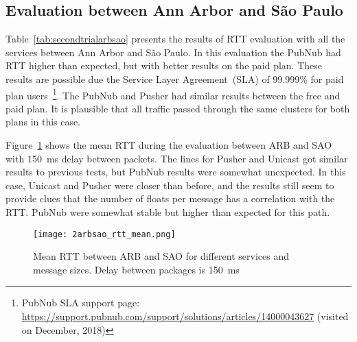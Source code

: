 \subsection*{Evaluation between Ann Arbor and São Paulo} 

Table~\ref{tab:secondtrialarbsao} presents the results of RTT evaluation with all the services between Ann Arbor and São Paulo.
In this evaluation the PubNub had RTT higher than expected, but with better results on the paid plan.
These results are possible due the Service Layer Agreement~(SLA) of 99.999\% for paid plan users~\footnote{PubNub SLA support page: \url{https://support.pubnub.com/support/solutions/articles/14000043627} (visited on December, 2018)}. 
The PubNub and Pusher had similar results between the free and paid plan.
It is plausible that all traffic passed through the same clusters for both plans in this case.

Figure~\ref{fig:second-arb-sao-rtt} shows the mean RTT during the evaluation between ARB and SAO with 150~ms delay between packets.
The lines for Pusher and Unicast got similar results to previous tests, but PubNub results were somewhat unexpected.
In this case, Unicast and Pusher were closer than before, and the results still seem to provide clues that the number of floats per message has a correlation with the RTT.
PubNub were somewhat stable but higher than expected for this path.

\begin{figure}[!ht]
	\centering
	\texttt{[image: 2arbsao\_rtt\_mean.png]}
	\caption{Mean RTT between ARB and SAO for different services and message sizes. Delay between packages is 150~ms}
	\label{fig:second-arb-sao-rtt}
\end{figure}

